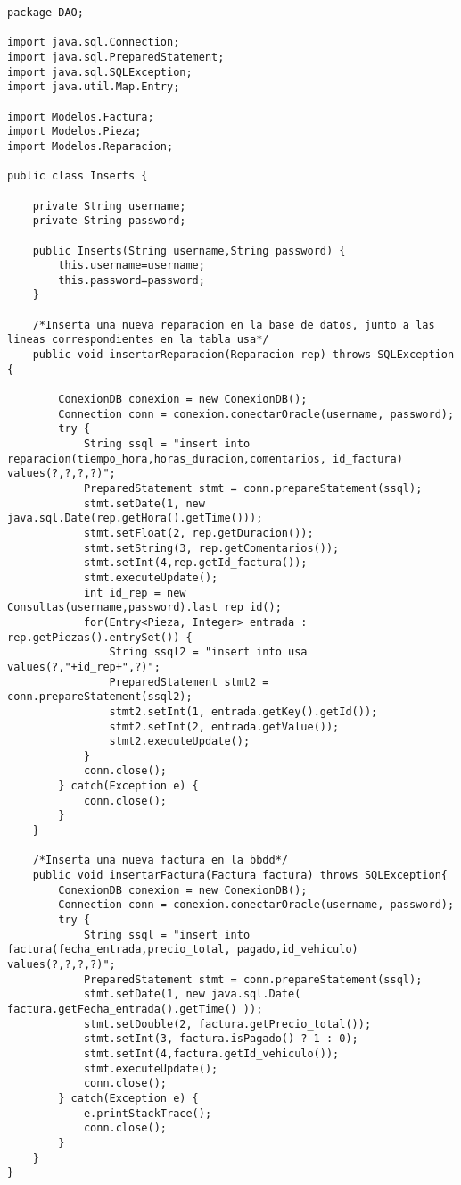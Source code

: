 \clearpage
\begin{lstlisting}[caption=Inserts.java (App Escritorio)]
package DAO;

import java.sql.Connection;
import java.sql.PreparedStatement;
import java.sql.SQLException;
import java.util.Map.Entry;

import Modelos.Factura;
import Modelos.Pieza;
import Modelos.Reparacion;

public class Inserts {
	
	private String username;
	private String password;
	
	public Inserts(String username,String password) {
		this.username=username;
		this.password=password;
	}
	
	/*Inserta una nueva reparacion en la base de datos, junto a las lineas correspondientes en la tabla usa*/
	public void insertarReparacion(Reparacion rep) throws SQLException {
		
		ConexionDB conexion = new ConexionDB();
		Connection conn = conexion.conectarOracle(username, password);
		try {
			String ssql = "insert into reparacion(tiempo_hora,horas_duracion,comentarios, id_factura) values(?,?,?,?)";
			PreparedStatement stmt = conn.prepareStatement(ssql);
			stmt.setDate(1, new java.sql.Date(rep.getHora().getTime()));
			stmt.setFloat(2, rep.getDuracion());
			stmt.setString(3, rep.getComentarios());
			stmt.setInt(4,rep.getId_factura());
			stmt.executeUpdate();
			int id_rep = new Consultas(username,password).last_rep_id();
			for(Entry<Pieza, Integer> entrada : rep.getPiezas().entrySet()) {
				String ssql2 = "insert into usa values(?,"+id_rep+",?)";
				PreparedStatement stmt2 = conn.prepareStatement(ssql2);
				stmt2.setInt(1, entrada.getKey().getId());
				stmt2.setInt(2, entrada.getValue());
				stmt2.executeUpdate();
			}
			conn.close();
		} catch(Exception e) {
			conn.close();
		}
	}
	
	/*Inserta una nueva factura en la bbdd*/
	public void insertarFactura(Factura factura) throws SQLException{
		ConexionDB conexion = new ConexionDB();
		Connection conn = conexion.conectarOracle(username, password);
		try {
			String ssql = "insert into factura(fecha_entrada,precio_total, pagado,id_vehiculo) values(?,?,?,?)";
			PreparedStatement stmt = conn.prepareStatement(ssql);			
			stmt.setDate(1, new java.sql.Date( factura.getFecha_entrada().getTime() ));
			stmt.setDouble(2, factura.getPrecio_total());
			stmt.setInt(3, factura.isPagado() ? 1 : 0);
			stmt.setInt(4,factura.getId_vehiculo());
			stmt.executeUpdate();
			conn.close();	
		} catch(Exception e) {
			e.printStackTrace();
			conn.close();
		}
	}
}
\end{lstlisting}
